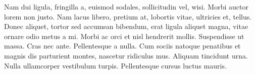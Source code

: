 Nam dui ligula, fringilla a, euismod sodales, sollicitudin vel, wisi. Morbi auctor
lorem non justo. Nam lacus libero, pretium at, lobortis vitae, ultricies et, tellus.
Donec aliquet, tortor sed accumsan bibendum, erat ligula aliquet magna, vitae
ornare odio metus a mi. Morbi ac orci et nisl hendrerit mollis. Suspendisse ut
massa. Cras nec ante. Pellentesque a nulla. Cum sociis natoque penatibus et
magnis dis parturient montes, nascetur ridiculus mus. Aliquam tincidunt urna.
Nulla ullamcorper vestibulum turpis. Pellentesque cursus luctus mauris.
